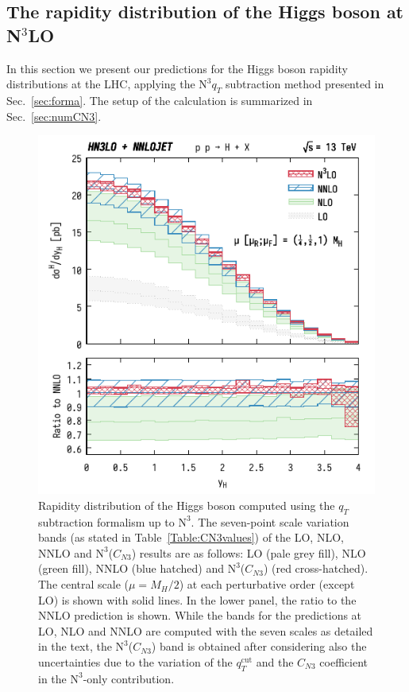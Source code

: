 \documentclass[12pt]{article}
\DeclareRobustCommand{\qt}{\ensuremath{q_T}\xspace}
\DeclareRobustCommand{\qtcut}{\ensuremath{q_T^\mathrm{cut}}\xspace}
\DeclareRobustCommand{\LO}{\text{LO}\xspace}
\DeclareRobustCommand{\N}[1]{\ensuremath{\text{N}^{#1}}} %
\begin{document}
\subsection{The rapidity distribution of the Higgs boson at \texorpdfstring{N${}^\text{3}$LO}{N3LO}}
\label{sec:results}

In this section we present our predictions for the Higgs boson rapidity distributions at the LHC, applying the \N3\LO $\qt$ subtraction method presented in Sec.~\ref{sec:forma}. The setup of the calculation is summarized in Sec.~\ref{sec:numCN3}. 

\begin{figure}[tbh]
\centering
\includegraphics[width=.6\linewidth]{./new_figures/yH_B02_best}
\caption{\label{fig:yHN3LO}{Rapidity distribution of the Higgs boson computed using the $\qt$ subtraction formalism up to \N3\LO. The seven-point scale variation bands (as stated in Table~\ref{Table:CN3values}) of the LO, NLO, NNLO and \N3\LO($C_{N3}$) results are as follows: LO (pale grey fill), NLO (green fill), NNLO (blue hatched) and \N3\LO($C_{N3}$) (red cross-hatched). The central scale ($\mu=M_{H}/2$) at each perturbative order (except LO) is shown with solid lines. In the lower panel, the ratio to the NNLO prediction is shown. While the bands for the predictions at LO, NLO and NNLO are computed with the seven scales as detailed in the text, the \N3\LO($C_{N3}$) band is obtained after considering also the uncertainties due to the variation of the $\qtcut$ and the $C_{N3}$ coefficient in the 
\N3\LO-only contribution.
}}
\end{figure}
\end{document}
